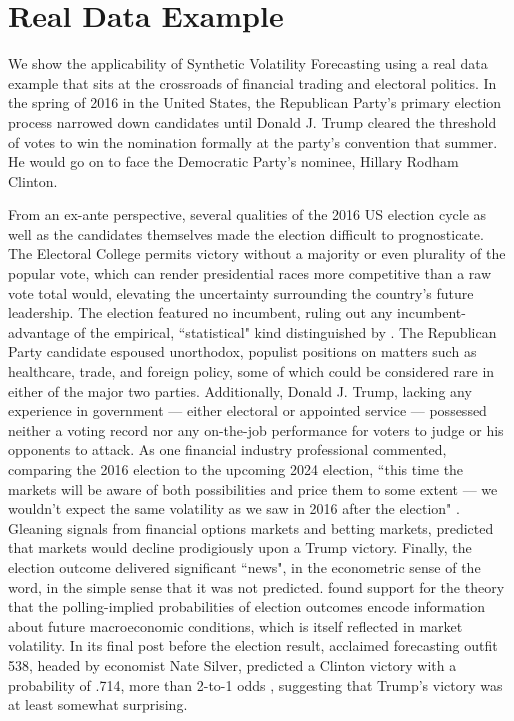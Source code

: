 \documentclass[11pt]{article}
\theoremstyle{definition}
\begin{document}
\section{Real Data Example}

We show the applicability of Synthetic Volatility Forecasting using a real data example that sits at the crossroads of financial trading and electoral politics.  In the spring of 2016 in the United States, the Republican Party's primary election process narrowed down candidates until Donald J. Trump cleared the threshold of votes to win the nomination formally at the party's convention that summer.  He would go on to face the Democratic Party's nominee, Hillary Rodham Clinton.   

From an ex-ante perspective, several qualities of the 2016 US election cycle as well as the candidates themselves made the election difficult to prognosticate.  The Electoral College permits victory without a majority or even plurality of the popular vote, which can render presidential races more competitive than a raw vote total would, elevating the uncertainty surrounding the country's future leadership.  The election featured no incumbent, ruling out any incumbent-advantage of the empirical, ``statistical" kind distinguished by \citet{mayhew2008incumbency}.  The Republican Party candidate espoused unorthodox, populist positions on matters such as healthcare, trade, and foreign policy, some of which could be considered rare in either of the major two parties.  Additionally, Donald J. Trump, lacking any experience in government --- either electoral or appointed service --- possessed neither a voting record nor any on-the-job performance for voters to judge or his opponents to attack. As one financial industry professional commented, comparing the 2016 election to the upcoming 2024 election, ``this time the markets will be aware of both possibilities and price them to some extent — we wouldn’t expect the same volatility as we saw in 2016 after the election" \citep{Bloomberg.com_2024}. Gleaning signals from financial options markets and betting markets, \citet{wolfers2016financial} predicted that markets would decline prodigiously upon a Trump victory.  Finally, the election outcome delivered significant ``news", in the econometric sense of the word, in the simple sense that it was not predicted.  \citet{goodell2013us} found support for the theory that the polling-implied probabilities of election outcomes encode information about future macroeconomic conditions, which is itself reflected in market volatility.  In its final post before the election result, acclaimed forecasting outfit 538, headed by economist Nate Silver, predicted a Clinton victory with a probability of .714, more than 2-to-1 odds \citep{Silver_2016}, suggesting that Trump's victory was at least somewhat surprising.  
\end{document}

